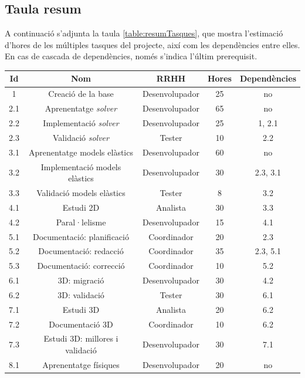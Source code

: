 \documentclass[a4paper]{article} %
\begin{document}
	\subsection{Taula resum}
	A continuació s'adjunta la taula \ref{table:resumTasques}, que mostra l'estimació d'hores de les múltiples tasques del projecte, així com les dependències entre elles. En cas de cascada de dependències, només s'indica l'últim prerequisit.
	\begin{table}[h!]
		\centering
		\hspace*{-0.5cm}
		\begin{tabular}{|| c || c | c | c c||}
			\hline
			\textbf{Id} & \textbf{Nom} & \textbf{RRHH} & \textbf{Hores} & \textbf{Dependències} \\ 
			\hline\hline
			1 & Creació de la base & Desenvolupador & 25 & no \\
			\hline
			2.1 & Aprenentatge \textit{solver} & Desenvolupador & 65 & no \\
			2.2 & Implementació \textit{solver} & Desenvolupador & 25 & 1, 2.1 \\
			2.3 & Validació \textit{solver} & Tester & 10 & 2.2 \\
			\hline
			3.1 & Aprenentatge models elàstics & Desenvolupador & 60 & no \\
			3.2 & Implementació models elàstics & Desenvolupador & 30 & 2.3, 3.1 \\
			3.3 & Validació models elàstics & Tester & 8 & 3.2 \\
			\hline
			4.1 & Estudi 2D & Analista & 30 & 3.3 \\
			4.2 & Paral·lelisme & Desenvolupador & 15 & 4.1 \\
			\hline
			5.1 & Documentació: planificació & Coordinador & 20 & 2.3 \\
			5.2 & Documentació: redacció & Coordinador & 35 & 2.3, 5.1 \\
			5.3 & Documentació: correcció & Coordinador & 10 & 5.2 \\
			\hline
			6.1 & 3D: migració & Desenvolupador & 30 & 4.2 \\
			6.2 & 3D: validació & Tester & 30 & 6.1 \\
			\hline
			7.1 & Estudi 3D & Analista & 20 & 6.2 \\
			7.2 & Documentació 3D  & Coordinador & 10 & 6.2 \\
			7.3 & Estudi 3D: millores i validació & Desenvolupador & 30 & 7.1 \\
			\hline
			8.1 & Aprenentatge físiques & Desenvolupador & 20 & no \\

\end{tabular}
\end{table}
\end{document}
